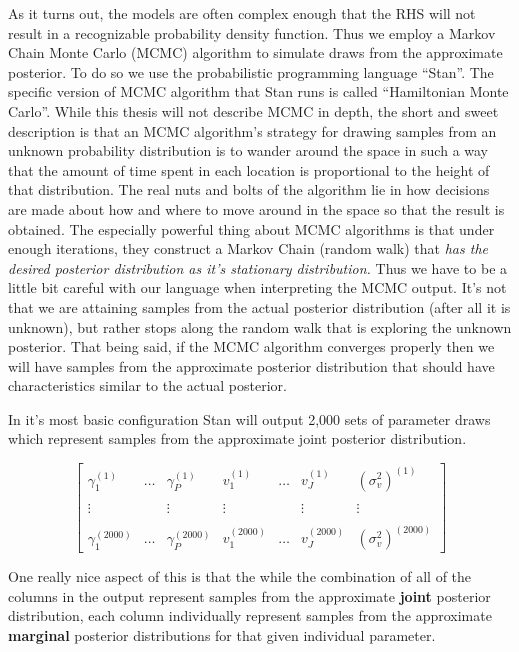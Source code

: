 \documentclass[12pt,twoside]{reedthesis}
\begin{document}
As it turns out, the models are often complex enough that the RHS will not result in a recognizable probability density function. Thus we employ a Markov Chain Monte Carlo (MCMC) algorithm to simulate draws from the approximate posterior. To do so we use the probabilistic programming language ``Stan''. The specific version of MCMC algorithm that Stan runs is called ``Hamiltonian Monte Carlo''. While this thesis will not describe MCMC in depth, the short and sweet description is that an MCMC algorithm's strategy for drawing samples from an unknown probability distribution is to wander around the space in such a way that the amount of time spent in each location is proportional to the height of that distribution. The real nuts and bolts of the algorithm lie in how decisions are made about how and where to move around in the space so that the result is obtained. The especially powerful thing about MCMC algorithms is that under enough iterations, they construct a Markov Chain (random walk) that \emph{has the desired posterior distribution as it's stationary distribution.} Thus we have to be a little bit careful with our language when interpreting the MCMC output. It's not that we are attaining samples from the actual posterior distribution (after all it is unknown), but rather stops along the random walk that is exploring the unknown posterior. That being said, if the MCMC algorithm converges properly then we will have samples from the approximate posterior distribution that should have characteristics similar to the actual posterior.

In it's most basic configuration Stan will output 2,000 sets of parameter draws which represent samples from the approximate joint posterior distribution.

\[
\begin{bmatrix}
  \gamma_1^{(1)} & \dots & \gamma_P^{(1)} & v_1^{(1)} & \dots & v_J^{(1)}  & (\sigma_v^2)^{(1)} \\
  \\ \vdots   &  & \vdots  & \vdots & &  \vdots & \vdots  \\ \\
  \gamma_1^{(2000)} & \dots &\gamma_P^{(2000)} & v_1^{(2000)}& \dots & v_J^{(2000)} & (\sigma_v^2)^{(2000)}
\end{bmatrix}
\]

One really nice aspect of this is that the while the combination of all of the columns in the output represent samples from the approximate \textbf{joint} posterior distribution, each column individually represent samples from the approximate \textbf{marginal} posterior distributions for that given individual parameter.
\end{document}
